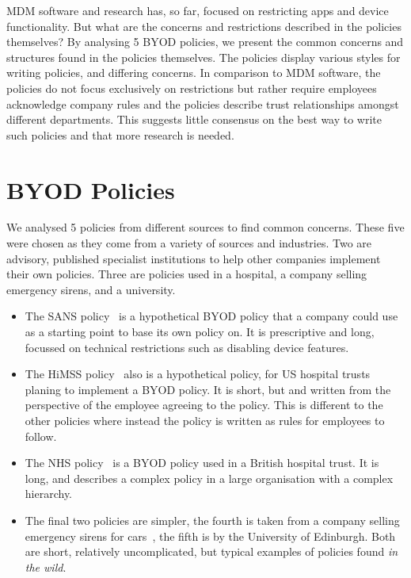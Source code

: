 \documentclass[conference,twocolumn]{IEEEtran}
\begin{document}
MDM software and research has, so far, focused on restricting apps and device functionality.
But what are the concerns and restrictions described in the policies themselves?
By analysing 5 BYOD policies, we present the common concerns and structures found in the policies themselves.
The policies display various styles for writing policies, and differing concerns.
In comparison to MDM software, the policies do not focus exclusively on restrictions but rather require employees acknowledge company rules and the policies describe trust relationships amongst different departments.
This suggests little consensus on the best way to write such policies and that more research is needed.

\section{BYOD Policies}
\label{sec:byod_policies}

We analysed 5 policies from different sources to find common concerns.
These five were chosen as they come from a variety of sources and industries.
Two are advisory, published specialist institutions to help other companies implement their own policies.
Three are policies used in a hospital, a company selling emergency sirens, and a university.
\begin{itemize}
  \item The SANS policy~\cite{nicholas_r._c._guerin_security_2008} is a hypothetical BYOD policy that a company could use as a starting point to base its own policy on.
    It is prescriptive and long, focussed on technical restrictions such as disabling device features.
  \item The HiMSS policy~\cite{healthcare_information_and_management_systems_society_mobile_2012} also is a hypothetical policy, for US hospital trusts planing to implement a BYOD policy.
    It is short, but and written from the perspective of the employee agreeing to the policy.
    This is different to the other policies where instead the policy is written as rules for employees to follow.
  \item The NHS policy~\cite{kennington_mobiles_2014} is a BYOD policy used in a British hospital trust.
    It is long, and describes a complex policy in a large organisation with a complex hierarchy.
  \item The final two policies are simpler, the fourth is taken from a company selling emergency sirens for cars~\cite{code3pse.org_sample_????}, the fifth is by the University of Edinburgh.  
Both are short, relatively uncomplicated, but typical examples of policies found \emph{in the wild}.
\end{itemize}
\end{document}
